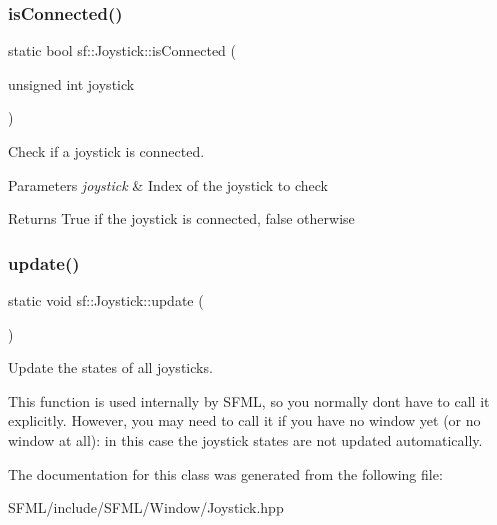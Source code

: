 \subsubsection{\texorpdfstring{isConnected()}{isConnected()}}
{\footnotesize\ttfamily static bool sf\+::\+Joystick\+::is\+Connected (\begin{DoxyParamCaption}\item[{unsigned int}]{joystick }\end{DoxyParamCaption})\hspace{0.3cm}{\ttfamily [static]}}



Check if a joystick is connected. 


\begin{DoxyParams}{Parameters}
{\em joystick} & Index of the joystick to check\\
\hline
\end{DoxyParams}
\begin{DoxyReturn}{Returns}
True if the joystick is connected, false otherwise \begin{DoxyVerb}\end{DoxyVerb}
 
\end{DoxyReturn}
\mbox{\label{classsf_1_1_joystick_ab85fa9175b4edd3e5a07ee3cde0b0f48}} 
\subsubsection{\texorpdfstring{update()}{update()}}
{\footnotesize\ttfamily static void sf\+::\+Joystick\+::update (\begin{DoxyParamCaption}{ }\end{DoxyParamCaption})\hspace{0.3cm}{\ttfamily [static]}}



Update the states of all joysticks. 

This function is used internally by S\+F\+ML, so you normally don\textquotesingle{}t have to call it explicitly. However, you may need to call it if you have no window yet (or no window at all)\+: in this case the joystick states are not updated automatically. \begin{DoxyVerb}\end{DoxyVerb}
 

The documentation for this class was generated from the following file\+:\begin{DoxyCompactItemize}
\item 
S\+F\+M\+L/include/\+S\+F\+M\+L/\+Window/Joystick.\+hpp\end{DoxyCompactItemize}
